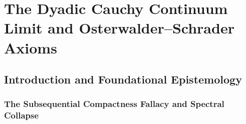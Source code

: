 \chapter{The Dyadic Cauchy Continuum Limit and Osterwalder--Schrader Axioms}
\label{ch:dyadic_cauchy_continuum}
\label{ch:cauchy}

\section{Introduction and Foundational Epistemology}
\label{sec:ch16_intro}

\subsection{The Subsequential Compactness Fallacy and Spectral Collapse}
\label{subsec:subsequential_fallacy}

